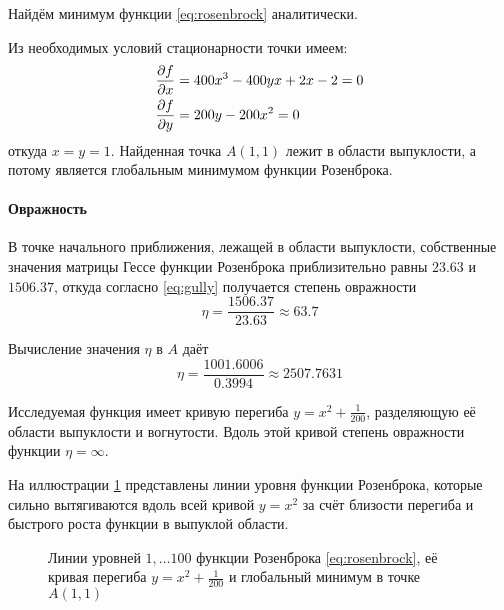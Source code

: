 Найдём минимум функции \eqref{eq:rosenbrock} аналитически.

Из необходимых условий стационарности точки имеем:
\begin{align*}
  \frac{\partial{f}}{\partial{x}} &= 400x^3-400yx+2x-2 = 0 \\
  \frac{\partial{f}}{\partial{y}} &= 200y-200x^2 = 0
\end{align*}
откуда $x = y = 1$. Найденная точка $A(1, 1)$ лежит в области
выпуклости, а потому является глобальным минимумом функции Розенброка.

\paragraph{Овражность}

В точке начального приближения, лежащей в области выпуклости,
собственные значения матрицы Гессе функции Розенброка приблизительно
равны $23.63$ и $1506.37$, откуда согласно \eqref{eq:gully} получается
степень овражности
\begin{equation}
  \label{eq:rosenbrock-gully-start}
  \eta = \frac{1506.37}{23.63} \approx 63.7
\end{equation}

Вычисление значения $\eta$ в $A$ даёт
\begin{equation}
  \label{eq:rosenbrock-gully-extr}
  \eta = \frac{1001.6006}{0.3994} \approx 2507.7631
\end{equation}

Исследуемая функция имеет кривую перегиба $y=x^2+\frac{1}{200}$,
разделяющую её области выпуклости и вогнутости. Вдоль этой кривой
степень овражности функции $\eta = \infty$.

На иллюстрации \ref{fig:rosenbrock-contours} представлены линии уровня
функции Розенброка, которые сильно вытягиваются вдоль всей кривой
$y=x^2$ за счёт близости перегиба и быстрого роста функции в выпуклой
области.

\begin{figure}[thb]
  \centering
  \caption[Функция Розенброка]{Линии уровней $1, \dotsc 100$ функции
    Розенброка \eqref{eq:rosenbrock}, её кривая перегиба
    $y=x^2+\frac{1}{200}$ и глобальный минимум в точке $A(1, 1)$}
  \label{fig:rosenbrock-contours}
\end{figure}

